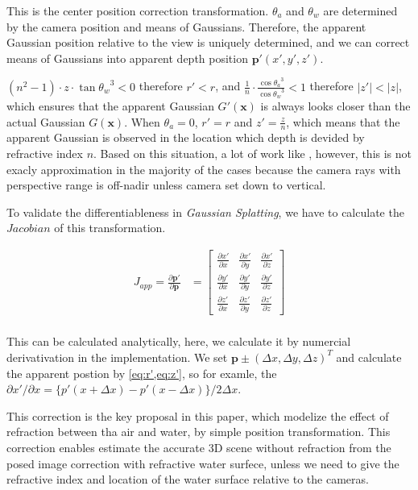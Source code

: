 This is the center position correction transformation.
$\theta_a$ and $\theta_w$ are determined by the camera position and means of Gaussians. 
Therefore, the apparent Gaussian position relative to the view is uniquely determined, and we can correct means of Gaussians into apparent depth position $\bm{p'}(x', y', z')$.

$(n^2 -1) \cdot z \cdot {\tan \theta_w}^3 < 0$ therefore $r' < r$, and $\frac{1}{n} \cdot \frac{{\cos \theta_a}^3}{{\cos \theta_w}^3} < 1$ therefore $\left| z' \right| < \left| z \right|$, which ensures that the apparent Gaussian $G'(\bm{x})$ is always looks closer than the actual Gaussian $G(\bm{x})$. 
When $\theta_a = 0$, $r' = r$ and $z' = \frac{z}{n}$, which means that the apparent Gaussian is observed in the location which depth is devided by refractive index $n$.
Based on this situation, a lot of work like \parencite{nassar1994_ApparentDepth,Missailidis2025_apparentDepth-leading}, however, this is not exacly approximation in the majority of the cases because the camera rays with perspective range is off-nadir unless camera set down to vertical.

To validate the differentiableness in \textit{Gaussian Splatting}, we have to calculate the $\textit{Jacobian}$ of this transformation.

\begin{equation}\label{eq:Jacobian}
  \begin{split}
    J_{app} = 
    \frac{\partial \bm{p'}}{\partial \bm{p}} &= 
    \begin{bmatrix} 
      \frac{\partial x'}{\partial x} & \frac{\partial x'}{\partial y} & \frac{\partial x'}{\partial z} \\
      \frac{\partial y'}{\partial x} & \frac{\partial y'}{\partial y} & \frac{\partial y'}{\partial z} \\ 
      \frac{\partial z'}{\partial x} & \frac{\partial z'}{\partial y} & \frac{\partial z'}{\partial z} 
    \end{bmatrix} \\
  \end{split}
\end{equation}

This can be calculated analytically, here, we calculate it by numercial derivativation in the implementation. 
We set $\bm{p} \pm {(\Delta x, \Delta y, \Delta z)}^T$ and calculate the apparent postion by \cref{eq:r',eq:z'}, so for examle, the ${\partial x'} / {\partial x} = \lbrace p'(x+\Delta x) - p'(x-\Delta x) \rbrace / 2\Delta x$.

This correction is the key proposal in this paper, which modelize the effect of refraction between tha air and water, by simple position transformation. 
This correction enables estimate the accurate 3D scene without refraction from the posed image correction with refractive water surfece, unless we need to give the refractive index and location of the water surface relative to the cameras.


